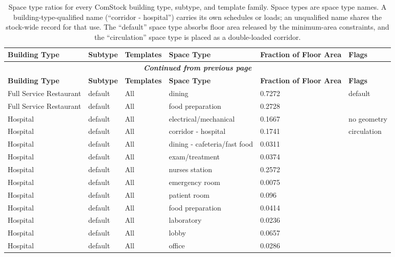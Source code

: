 \begin{center}
\scriptsize
\begin{longtable}{|p{1.0in}|p{1.05in}|p{1.1in}|p{1.9in}|p{0.55in}|p{0.95in}|}
\caption[Space Type Ratios]{Space type ratios for every ComStock building type, subtype, and template family. Space types are space type names. A building-type-qualified name (``corridor - hospital'') carries its own schedules or loads; an unqualified name shares the stock-wide record for that use. The ``default'' space type absorbs floor area released by the minimum-area constraints, and the ``circulation'' space type is placed as a double-loaded corridor.} \\ \hline
\label{tab:space_type_ratios_all}
\textbf{Building Type} & \textbf{Subtype} & \textbf{Templates} & \textbf{Space Type} & \textbf{Fraction of Floor Area} & \textbf{Flags} \\ \hline
\endfirsthead
\multicolumn{6}{c}{{\bfseries \textit{Continued from previous page}}} \\ \hline
\textbf{Building Type} & \textbf{Subtype} & \textbf{Templates} & \textbf{Space Type} & \textbf{Fraction of Floor Area} & \textbf{Flags} \\ \hline
\endhead
Full Service Restaurant & default & All & dining & 0.7272 & default \\ \hline
Full Service Restaurant & default & All & food preparation & 0.2728 &  \\ \hline
Hospital & default & All & electrical/mechanical & 0.1667 & no geometry \\ \hline
Hospital & default & All & corridor - hospital & 0.1741 & circulation \\ \hline
Hospital & default & All & dining - cafeteria/fast food & 0.0311 &  \\ \hline
Hospital & default & All & exam/treatment & 0.0374 &  \\ \hline
Hospital & default & All & nurses station & 0.2572 &  \\ \hline
Hospital & default & All & emergency room & 0.0075 &  \\ \hline
Hospital & default & All & patient room & 0.096 &  \\ \hline
Hospital & default & All & food preparation & 0.0414 &  \\ \hline
Hospital & default & All & laboratory & 0.0236 &  \\ \hline
Hospital & default & All & lobby & 0.0657 &  \\ \hline
Hospital & default & All & office & 0.0286 &  \\ \hline

\end{longtable}
\end{center}
